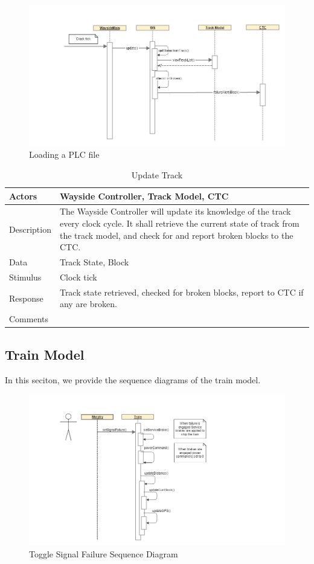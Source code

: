 \documentclass[]{article}
\begin{document}
	
	\begin{figure}[H]
		\centering
		\includegraphics[scale=.5]{seq_wayside_updatetrack.png}
		\caption{Loading a PLC file}
	\end{figure}
	\begin{table}[H]
		\centering
		\caption{Update Track}
		\begin{tabular}{|l|l|}
			\hline
			Actors & \parbox[t]{10cm}{Wayside Controller, Track Model, CTC} \\ \hline
			Description & \parbox[t]{10cm}{The Wayside Controller will update its knowledge of the track every clock cycle. It shall retrieve the current state of track from the track model, and check for and report broken blocks to the CTC.} \\ \hline
			Data &  \parbox[t]{10cm}{Track State, Block} \\ \hline
			Stimulus &  \parbox[t]{10cm}{Clock tick} \\ \hline
			Response & \parbox[t]{10cm}{Track state retrieved, checked for broken blocks, report to CTC if any are broken.}\\ \hline
			Comments & \parbox[t]{10cm}{}  \\ \hline
		\end{tabular}
	\end{table}

\subsection{Train Model}
In this seciton, we provide the sequence diagrams of the train model.
\begin{figure}[H]
	\centering
	\includegraphics[scale=.5]{train_model_sqd_toggle_signal_failure.png}
	\caption{Toggle Signal Failure Sequence Diagram}
\end{figure}
\end{document}
